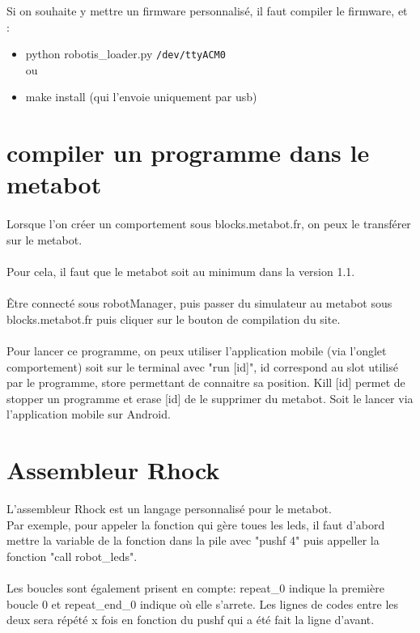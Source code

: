 \documentclass[10pt,a4paper]{report}
\begin{document}
Si on souhaite y mettre un firmware personnalisé, il faut compiler le firmware, et :
\begin{itemize}
\item python robotis\_loader.py \texttt{/dev/ttyACM0}
\\ou
\item make install (qui l'envoie uniquement par usb)
\end{itemize}

\section{compiler un programme dans le metabot}
\paragraph{}
Lorsque l'on créer un comportement sous blocks.metabot.fr, on peux le transférer sur le metabot.
\paragraph{}
Pour cela, il faut que le metabot soit au minimum dans la version 1.1.
\paragraph{}
Être connecté sous robotManager, puis passer du simulateur au metabot sous blocks.metabot.fr puis cliquer sur le bouton de compilation du site.
\paragraph{}
Pour lancer ce programme, on peux utiliser l'application mobile (via l'onglet comportement) soit sur le terminal avec "run [id]", id correspond au slot utilisé par le programme, store permettant de connaitre sa position. Kill [id] permet de stopper un programme et erase [id] de le supprimer du metabot.
Soit le lancer via l'application mobile sur Android.
\newpage
\section{Assembleur Rhock}
L'assembleur Rhock est un langage personnalisé pour le metabot.\\
Par exemple, pour appeler la fonction qui gère toues les leds, il faut d'abord mettre la variable de la fonction dans la pile avec "pushf 4" puis appeller la fonction "call robot\_leds".
\paragraph{}
Les boucles sont également prisent en compte: repeat\_0 indique la première boucle 0 et repeat\_end\_0 indique où elle s'arrete. Les lignes de codes entre les deux sera répété x fois en fonction du pushf qui a été fait la ligne d'avant.
\end{document}
